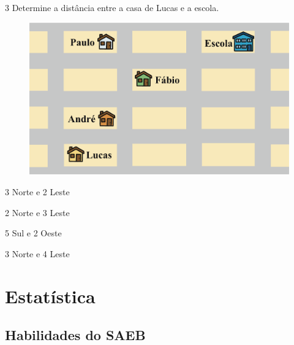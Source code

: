 \num{3} Determine a distância entre a casa de Lucas e a escola.

\begin{figure}[htpb!]
\centering
\includegraphics[width=\textwidth]{./ilustras-mat/modulo_12-treino_3.png}
\end{figure}

\begin{escolha}

  \item 3 Norte e 2 Leste

  \item 2 Norte e 3 Leste

  \item 5 Sul e 2 Oeste

  \item 3 Norte e 4 Leste

\end{escolha}


\chapter{Estatística}

\section{Habilidades do SAEB}

